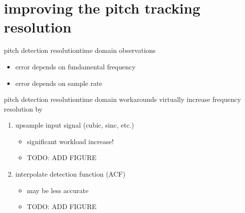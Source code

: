     \section[time domain]{improving the pitch tracking resolution}
        \begin{frame}{pitch detection resolution}{time domain observations}
            
            \begin{itemize}
                \item   error depends on fundamental frequency
                \item   error depends on sample rate
            \end{itemize}
        \end{frame}
        \begin{frame}{pitch detection resolution}{time domain workarounds}
            virtually increase frequency resolution by
            \bigskip
            \begin{enumerate}
                \item   upsample input signal (cubic, sinc, etc.)
                    \begin{itemize}
                        \item   significant workload increase!
                        \item   TODO: ADD FIGURE
                    \end{itemize}
                \bigskip
                \item<2->   interpolate detection function (ACF)
                    \begin{itemize}
                        \item   may be less accurate
                        \item   TODO: ADD FIGURE
                    \end{itemize}
            \end{enumerate}
        \end{frame}
	
